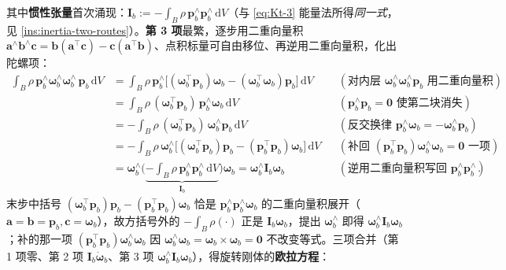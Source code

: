 其中\textbf{惯性张量}首次涌现：$\mathbf{I}_b:=-\int_B\rho\,\boldsymbol{p}_b^\wedge\boldsymbol{p}_b^\wedge\,\mathrm{d}V$（与 \cref{eq:Kt-3} 能量法所得\emph{同一式}，见 \cref{ins:inertia-two-routes}）。\textbf{第 3 项}最繁，逐步用二重向量积 $\boldsymbol{a}^\wedge\boldsymbol{b}^\wedge\boldsymbol{c}=\boldsymbol{b}(\boldsymbol{a}^\top\boldsymbol{c})-\boldsymbol{c}(\boldsymbol{a}^\top\boldsymbol{b})$、点积标量可自由移位、再逆用二重向量积，化出陀螺项\cite{unitree2023quadruped}：
\begin{equation}
\begin{aligned}
  \int_B\rho\,\boldsymbol{p}_b^\wedge\boldsymbol{\omega}_b^\wedge\boldsymbol{\omega}_b^\wedge\,\boldsymbol{p}_b\,\mathrm{d}V
  &=\int_B\rho\,\boldsymbol{p}_b^\wedge\big[(\boldsymbol{\omega}_b^\top\boldsymbol{p}_b)\boldsymbol{\omega}_b-(\boldsymbol{\omega}_b^\top\boldsymbol{\omega}_b)\boldsymbol{p}_b\big]\,\mathrm{d}V
  &&(\text{对内层 }\boldsymbol{\omega}_b^\wedge\boldsymbol{\omega}_b^\wedge\boldsymbol{p}_b\text{ 用二重向量积})\\
  &=\int_B\rho\,(\boldsymbol{\omega}_b^\top\boldsymbol{p}_b)\,\boldsymbol{p}_b^\wedge\boldsymbol{\omega}_b\,\mathrm{d}V
  &&(\boldsymbol{p}_b^\wedge\boldsymbol{p}_b=\mathbf{0}\text{ 使第二块消失})\\
  &=-\int_B\rho\,(\boldsymbol{\omega}_b^\top\boldsymbol{p}_b)\,\boldsymbol{\omega}_b^\wedge\boldsymbol{p}_b\,\mathrm{d}V
  &&(\text{反交换律 }\boldsymbol{p}_b^\wedge\boldsymbol{\omega}_b=-\boldsymbol{\omega}_b^\wedge\boldsymbol{p}_b)\\
  &=-\int_B\rho\,\boldsymbol{\omega}_b^\wedge\big[(\boldsymbol{\omega}_b^\top\boldsymbol{p}_b)\boldsymbol{p}_b-(\boldsymbol{p}_b^\top\boldsymbol{p}_b)\boldsymbol{\omega}_b\big]\,\mathrm{d}V
  &&(\text{补回 }(\boldsymbol{p}_b^\top\boldsymbol{p}_b)\boldsymbol{\omega}_b^\wedge\boldsymbol{\omega}_b=\mathbf{0}\text{ 一项})\\
  &=\boldsymbol{\omega}_b^\wedge\Big(\underbrace{-\!\int_B\rho\,\boldsymbol{p}_b^\wedge\boldsymbol{p}_b^\wedge\,\mathrm{d}V}_{\mathbf{I}_b}\Big)\boldsymbol{\omega}_b
  =\boldsymbol{\omega}_b^\wedge\mathbf{I}_b\boldsymbol{\omega}_b
  &&(\text{逆用二重向量积写回 }\boldsymbol{p}_b^\wedge\boldsymbol{p}_b^\wedge).
\end{aligned}
\label{eq:moment-term3}
\end{equation}
末步中括号 $(\boldsymbol{\omega}_b^\top\boldsymbol{p}_b)\boldsymbol{p}_b-(\boldsymbol{p}_b^\top\boldsymbol{p}_b)\boldsymbol{\omega}_b$ 恰是 $\boldsymbol{p}_b^\wedge\boldsymbol{p}_b^\wedge\boldsymbol{\omega}_b$ 的二重向量积展开（$\boldsymbol{a}=\boldsymbol{b}=\boldsymbol{p}_b,\boldsymbol{c}=\boldsymbol{\omega}_b$），故方括号外的 $-\!\int_B\rho(\cdot)$ 正是 $\mathbf{I}_b\boldsymbol{\omega}_b$，提出 $\boldsymbol{\omega}_b^\wedge$ 即得 $\boldsymbol{\omega}_b^\wedge\mathbf{I}_b\boldsymbol{\omega}_b$；补的那一项 $(\boldsymbol{p}_b^\top\boldsymbol{p}_b)\boldsymbol{\omega}_b^\wedge\boldsymbol{\omega}_b$ 因 $\boldsymbol{\omega}_b^\wedge\boldsymbol{\omega}_b=\boldsymbol{\omega}_b\times\boldsymbol{\omega}_b=\mathbf{0}$ 不改变等式。三项合并（第 1 项零、第 2 项 $\mathbf{I}_b\dot{\boldsymbol{\omega}}_b$、第 3 项 $\boldsymbol{\omega}_b^\wedge\mathbf{I}_b\boldsymbol{\omega}_b$），得旋转刚体的\textbf{欧拉方程}\cite{dicarlo2018cheetah,unitree2023quadruped}：
